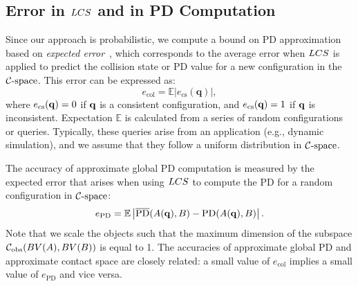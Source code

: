\subsection{Error in $LCS$ and in PD Computation}
\label{sec:errordefine}
Since our approach is probabilistic, we compute a bound on PD approximation based on \emph{expected
error}~\cite{Vapnik:1995:NSL}, which corresponds to the average error
when $LCS$ is applied to predict the
collision state or PD value for a new configuration in the $\mathcal C\text{-space}$.
This error can be expressed as:
\begin{equation}
\label{eq:2:Errdef0} e_{\text{col}} = \mathbb E
\left|e_\text{cs}(\mathbf q) \right|,
\end{equation}
where $e_{\text{cs}}(\mathbf q)=0$ if $\mathbf q$ is a consistent configuration, and $e_{\text{cs}}(\mathbf q)=1$ if $\mathbf q$ is inconsistent.
Expectation $\mathbb E$ is calculated from a series of
random configurations or queries. Typically, these queries arise from an application (e.g., dynamic simulation), and
we assume that they follow a uniform distribution in $\mathcal C\text{-space}$.

The accuracy of approximate global PD computation is measured by the expected error that arises
when using $LCS$ to compute the PD for a random configuration in $\mathcal C\text{-space}$:
\begin{equation}
\label{eq:2:Errdef} e_{\text{PD}} = \mathbb E
\left|\overline{\text{PD}}(A(\mathbf q), B) - \text{PD}(A(\mathbf q), B)\right|.
\end{equation}
Note that we scale the objects such that the maximum dimension of the subspace $\mathcal C_{\text{obs}} (BV(A),BV(B))$ is equal to 1.
The accuracies of approximate global PD and approximate contact space are closely related: a small value of $e_{\text{col}}$ implies a small value of $e_{\text{PD}}$ and vice versa.

